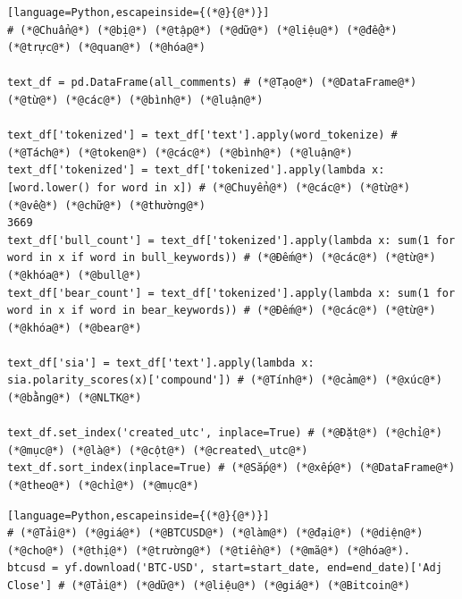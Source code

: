\begin{lstlisting}[language=Python,escapeinside={(*@}{@*)}]
# (*@Chuẩn@*) (*@bị@*) (*@tập@*) (*@dữ@*) (*@liệu@*) (*@để@*) (*@trực@*) (*@quan@*) (*@hóa@*)

text_df = pd.DataFrame(all_comments) # (*@Tạo@*) (*@DataFrame@*) (*@từ@*) (*@các@*) (*@bình@*) (*@luận@*)

text_df['tokenized'] = text_df['text'].apply(word_tokenize) # (*@Tách@*) (*@token@*) (*@các@*) (*@bình@*) (*@luận@*)
text_df['tokenized'] = text_df['tokenized'].apply(lambda x: [word.lower() for word in x]) # (*@Chuyển@*) (*@các@*) (*@từ@*) (*@về@*) (*@chữ@*) (*@thường@*)
3669
text_df['bull_count'] = text_df['tokenized'].apply(lambda x: sum(1 for word in x if word in bull_keywords)) # (*@Đếm@*) (*@các@*) (*@từ@*) (*@khóa@*) (*@bull@*)
text_df['bear_count'] = text_df['tokenized'].apply(lambda x: sum(1 for word in x if word in bear_keywords)) # (*@Đếm@*) (*@các@*) (*@từ@*) (*@khóa@*) (*@bear@*)

text_df['sia'] = text_df['text'].apply(lambda x: sia.polarity_scores(x)['compound']) # (*@Tính@*) (*@cảm@*) (*@xúc@*) (*@bằng@*) (*@NLTK@*)

text_df.set_index('created_utc', inplace=True) # (*@Đặt@*) (*@chỉ@*) (*@mục@*) (*@là@*) (*@cột@*) (*@created\_utc@*)
text_df.sort_index(inplace=True) # (*@Sắp@*) (*@xếp@*) (*@DataFrame@*) (*@theo@*) (*@chỉ@*) (*@mục@*)
\end{lstlisting}

\begin{lstlisting}[language=Python,escapeinside={(*@}{@*)}]
# (*@Tải@*) (*@giá@*) (*@BTCUSD@*) (*@làm@*) (*@đại@*) (*@diện@*) (*@cho@*) (*@thị@*) (*@trường@*) (*@tiền@*) (*@mã@*) (*@hóa@*).
btcusd = yf.download('BTC-USD', start=start_date, end=end_date)['Adj Close'] # (*@Tải@*) (*@dữ@*) (*@liệu@*) (*@giá@*) (*@Bitcoin@*)
\end{lstlisting}

